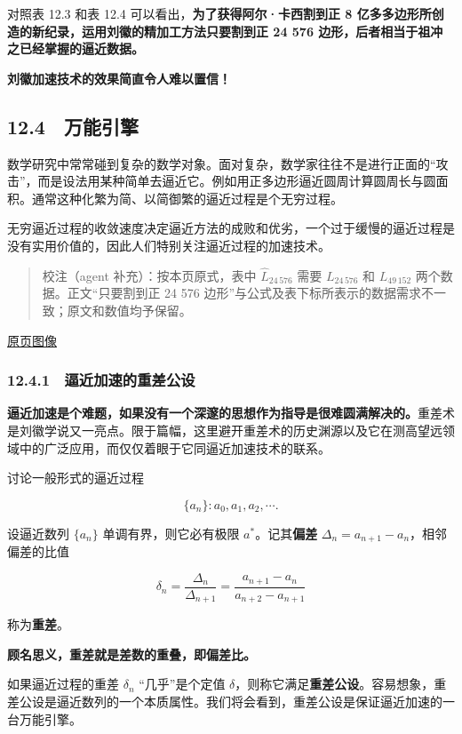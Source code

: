 \documentclass[
  10pt,
  fontset=fandol]{ctexart}
\begin{document}
对照表 12.3 和表 12.4 可以看出，\textbf{为了获得阿尔·卡西割到正 8 亿多多边形所创造的新纪录，运用刘徽的精加工方法只要割到正 24 576 边形，后者相当于祖冲之已经掌握的逼近数据。}

\textbf{刘徽加速技术的效果简直令人难以置信！}

\subsection{12.4　万能引擎}\label{ux4e07ux80fdux5f15ux64ce}

数学研究中常常碰到复杂的数学对象。面对复杂，数学家往往不是进行正面的``攻击''，而是设法用某种简单去逼近它。例如用正多边形逼近圆周计算圆周长与圆面积。通常这种化繁为简、以简御繁的逼近过程是个无穷过程。

无穷逼近过程的收敛速度决定逼近方法的成败和优劣，一个过于缓慢的逼近过程是没有实用价值的，因此人们特别关注逼近过程的加速技术。

\begin{quote}
校注（agent 补充）：按本页原式，表中 \(\widehat L_{24\,576}\) 需要 \(L_{24\,576}\) 和 \(L_{49\,152}\) 两个数据。正文``只要割到正 24 576 边形''与公式及表下标所表示的数据需求不一致；原文和数值均予保留。
\end{quote}

\href{../../source-images/pdf-305.jpeg}{原页图像}

\subsubsection{12.4.1　逼近加速的重差公设}\label{ux903cux8fd1ux52a0ux901fux7684ux91cdux5deeux516cux8bbe}

\textbf{逼近加速是个难题，如果没有一个深邃的思想作为指导是很难圆满解决的。}重差术是刘徽学说又一亮点。限于篇幅，这里避开重差术的历史渊源以及它在测高望远领域中的广泛应用，而仅仅着眼于它同逼近加速技术的联系。

讨论一般形式的逼近过程

\[
\{a_n\}:a_0,a_1,a_2,\cdots.
\]

设逼近数列 \(\{a_n\}\) 单调有界，则它必有极限 \(a^*\)。记其\textbf{偏差} \(\Delta_n=a_{n+1}-a_n\)，相邻偏差的比值

\[
\delta_n=\frac{\Delta_n}{\Delta_{n+1}}=\frac{a_{n+1}-a_n}{a_{n+2}-a_{n+1}}
\]

称为\textbf{重差}。

\textbf{顾名思义，重差就是差数的重叠，即偏差比。}

如果逼近过程的重差 \(\delta_n\) ``几乎''是个定值 \(\delta\)，则称它满足\textbf{重差公设}。容易想象，重差公设是逼近数列的一个本质属性。我们将会看到，重差公设是保证逼近加速的一台万能引擎。
\end{document}
